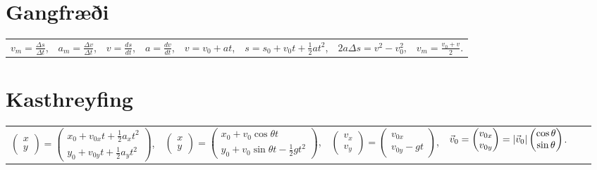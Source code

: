 \section*{Gangfræði}

\begin{table}[H]
\begin{tabular}{llllllll}
$v_m = \frac{\Delta s}{\Delta t}$, & $a_m =  \frac{\Delta v}{\Delta t} $, & $v = \frac{ds}{dt}$, & $a = \frac{dv}{dt}$, & $v = v_0 + at $, & $s = s_0 + v_0t + \frac{1}{2}at^2$, & $2a \Delta s = v^2 - v_0^2$, & $v_m = \frac{v_0 + v}{2}$.
\end{tabular}
\end{table}

\section*{Kasthreyfing}

\begin{table}[H]
\begin{tabular}{llllll}
 $\begin{pmatrix} x \\ y \end{pmatrix} =  \begin{pmatrix} x_0 + v_{0x}t + \frac{1}{2}a_xt^2 \\[5pt] y_0 + v_{0y}t + \frac{1}{2}a_yt^2 \end{pmatrix}$, & $\begin{pmatrix} x \\ y \end{pmatrix} = \begin{pmatrix} x_0 + v_{0}\cos\theta t \\ y_0 + v_0 \sin\theta t - \frac{1}{2}gt^2 \end{pmatrix}$, & $\begin{pmatrix} v_x \\ v_y \end{pmatrix} = \begin{pmatrix} v_{0x} \\ v_{0y} - gt \end{pmatrix}$, & $\Vec{v}_0 = \begin{pmatrix} v_{0x} \\ v_{0y} \end{pmatrix} =  \abs{\Vec{v}_0}\begin{pmatrix} \cos\theta \\ \sin\theta \end{pmatrix} $.
\end{tabular}
\end{table}

